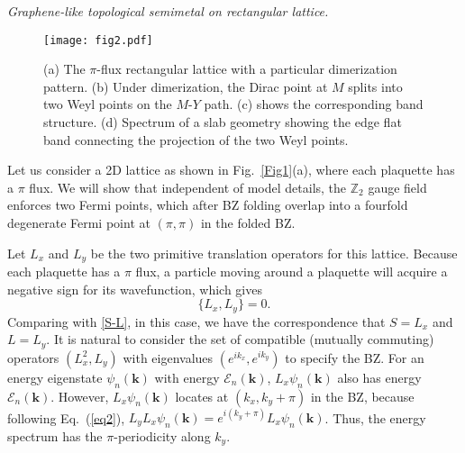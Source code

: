 \documentclass[aps,prl,twocolumn,noshowpacs,superscriptaddress]{revtex4-1}
\def \Z {\mathbb{Z}}
\def \k {\bm{k}}
\begin{document}
{\color{blue}\textit{Graphene-like topological semimetal on rectangular lattice.}}
\begin{figure}
	\texttt{[image: fig2.pdf]}
	\caption{(a) The $\pi$-flux rectangular lattice with a particular dimerization pattern. (b) Under dimerization, the Dirac point at $M$ splits into two Weyl points on the $M$-$Y$ path. (c) shows the corresponding band structure. (d) Spectrum of a slab geometry showing the edge flat band connecting the projection of the two Weyl points. \label{Fig2}}
\end{figure}
Let us consider a 2D lattice as shown in Fig.~\ref{Fig1}(a), where each plaquette has a $\pi$ flux. We will show that independent of model details, the $\Z_2$ gauge field enforces two Fermi points, which after BZ folding overlap into a fourfold degenerate Fermi point at $(\pi,\pi)$ in the folded BZ.



Let $L_x$ and $L_y$ be the two primitive translation operators for this lattice. Because each plaquette has a $\pi$ flux, a particle moving around a plaquette will acquire a negative sign for its wavefunction, which gives
\begin{equation}\label{L-projective}
\{L_x,L_y\}=0.
\end{equation}
Comparing with \eqref{S-L}, in this case, we have the correspondence that $S=L_x$ and $L=L_y$.
It is natural to consider the set of compatible (mutually commuting) operators $(L_x^2,L_y)$ with eigenvalues $(e^{ik_x},e^{ik_y})$ to specify the BZ.
For an energy eigenstate $\psi_n(\k)$ with energy $\mathcal{E}_n(\bm{k})$, $L_x\psi_n(\k)$ also has energy $\mathcal{E}_n(\bm{k})$. However, $L_x\psi_n(\k)$ locates at $(k_x,k_y+\pi)$ in the BZ, because following Eq.~(\ref{eq2}), $L_yL_x\psi_n(\k)=e^{i(k_y+\pi)}L_x\psi_n(\k)$. Thus, the energy spectrum has the $\pi$-periodicity along $k_y$.
\end{document}
